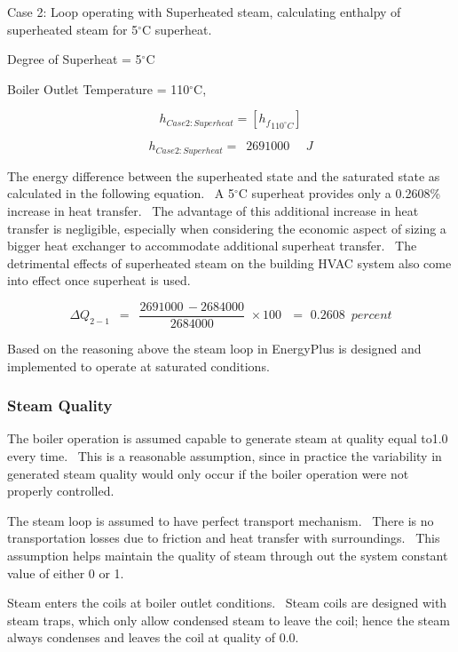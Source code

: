 Case 2: Loop operating with Superheated steam, calculating enthalpy of superheated steam for 5\(^{\circ}\)C superheat.

Degree of Superheat = 5\(^{\circ}\)C

Boiler Outlet Temperature = 110\(^{\circ}\)C,

\begin{equation}
{h_{Case2:Superheat}} = [{h_f}_{{{110}^ \circ }C}]
\end{equation}

\begin{equation}
{h_{Case2:Superheat}} = \,\,\,2691000\,\,\,\,\,\,\,\,J
\end{equation}

The energy difference between the superheated state and the saturated state as calculated in the following equation.~ A 5\(^{\circ}\)C superheat provides only a 0.2608\% increase in heat transfer.~ The advantage of this additional increase in heat transfer is negligible, especially when considering the economic aspect of sizing a bigger heat exchanger to accommodate additional superheat transfer.~ The detrimental effects of superheated steam on the building HVAC system also come into effect once superheat is used.

\begin{equation}
\Delta {Q_{2 - 1}}\,\,\, = \,\,\,\frac{{2691000\, - 2684000}}{{2684000}}\,\, \times 100\,\,\,\, = \,\,0.2608\,\,\,percent
\end{equation}

Based on the reasoning above the steam loop in EnergyPlus is designed and implemented to operate at saturated conditions.

\subsubsection{Steam Quality}\label{steam-quality}

The boiler operation is assumed capable to generate steam at quality equal to1.0 every time.~ This is a reasonable assumption, since in practice the variability in generated steam quality would only occur if the boiler operation were not properly controlled.

The steam loop is assumed to have perfect transport mechanism.~ There is no transportation losses due to friction and heat transfer with surroundings.~ This assumption helps maintain the quality of steam through out the system constant value of either 0 or 1.

Steam enters the coils at boiler outlet conditions.~ Steam coils are designed with steam traps, which only allow condensed steam to leave the coil; hence the steam always condenses and leaves the coil at quality of 0.0.

